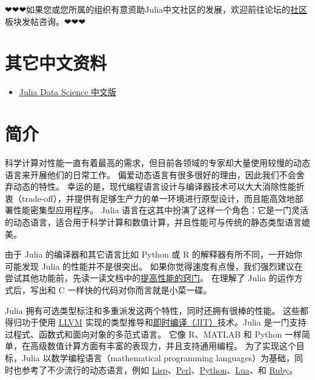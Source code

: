 ❤❤❤如果您或您所属的组织有意资助Julia中文社区的发展，欢迎前往论坛的\href{https://discourse.juliacn.com/c/community/13}{社区}板块发帖咨询。❤❤❤



\hypertarget{7405301553421440064}{}


\chapter{其它中文资料}



\begin{itemize}
\item \href{https://cn.julialang.org/JuliaDataScience/}{Julia Data Science 中文版}

\end{itemize}


\hypertarget{3498245216777255645}{}


\chapter{简介}



科学计算对性能一直有着最高的需求，但目前各领域的专家却大量使用较慢的动态语言来开展他们的日常工作。 偏爱动态语言有很多很好的理由，因此我们不会舍弃动态的特性。 幸运的是，现代编程语言设计与编译器技术可以大大消除性能折衷（trade-off），并提供有足够生产力的单一环境进行原型设计，而且能高效地部署性能密集型应用程序。 Julia 语言在这其中扮演了这样一个角色：它是一门灵活的动态语言，适合用于科学计算和数值计算，并且性能可与传统的静态类型语言媲美。



由于 Julia 的编译器和其它语言比如 Python 或 R 的解释器有所不同，一开始你可能发现 Julia 的性能并不是很突出。 如果你觉得速度有点慢，我们强烈建议在尝试其他功能前，先读一读文档中的\hyperlink{818954303942149020}{提高性能的窍门}。 在理解了 Julia 的运作方式后，写出和 C 一样快的代码对你而言就是小菜一碟。



Julia 拥有可选类型标注和多重派发这两个特性，同时还拥有很棒的性能。 这些都得归功于使用 \href{https://discourse.juliacn.com/t/topic/4203\#llvm}{LLVM} 实现的类型推导和\href{https://discourse.juliacn.com/t/topic/4203\#just-in-time-compilation}{即时编译（JIT）}技术。Julia 是一门支持过程式、函数式和面向对象的多范式语言。 它像 R、MATLAB 和 Python 一样简单，在高级数值计算方面有丰富的表现力，并且支持通用编程。 为了实现这个目标，Julia 以数学编程语言（mathematical programming languages）为基础，同时也参考了不少流行的动态语言，例如 \href{https://discourse.juliacn.com/t/topic/4203\#lisp}{Lisp}、\href{https://discourse.juliacn.com/t/topic/4203\#perl}{Perl}、\href{https://discourse.juliacn.com/t/topic/4203\#python}{Python}、\href{https://discourse.juliacn.com/t/topic/4203\#lua}{Lua}、和 \href{https://discourse.juliacn.com/t/topic/4203\#ruby}{Ruby}。



